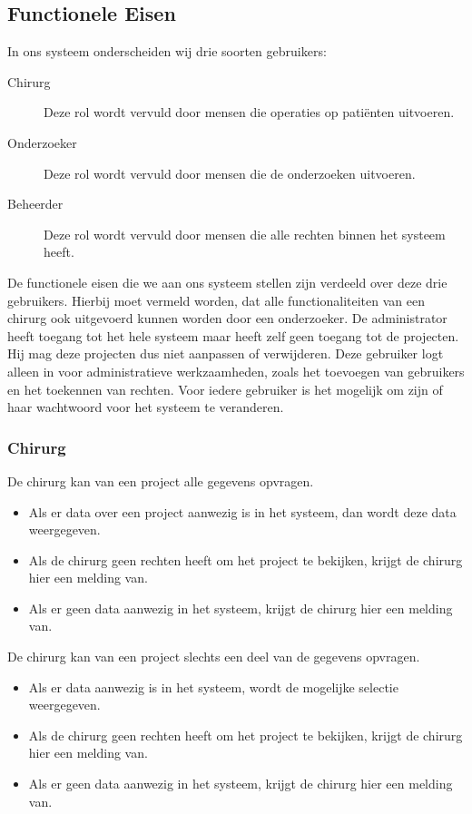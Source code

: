 \subsection{Functionele Eisen}
\label{functionele_eisen}
In ons systeem onderscheiden wij drie soorten gebruikers:
\begin{description}
	\item[Chirurg] Deze rol wordt vervuld door mensen die operaties op pati\"enten uitvoeren.
	\item[Onderzoeker] Deze rol wordt vervuld door mensen die de onderzoeken uitvoeren. 
	\item[Beheerder] Deze rol wordt vervuld door mensen die alle rechten binnen het systeem heeft.
\end{description}
De functionele eisen die we aan ons systeem stellen zijn verdeeld over deze drie gebruikers. Hierbij moet vermeld worden, dat alle functionaliteiten van een chirurg ook uitgevoerd kunnen worden door een onderzoeker.
De administrator heeft toegang tot het hele systeem maar heeft zelf geen toegang tot de projecten. Hij mag deze projecten dus niet aanpassen of verwijderen. Deze gebruiker logt alleen in voor administratieve werkzaamheden, zoals het toevoegen van gebruikers en het toekennen van rechten.
Voor iedere gebruiker is het mogelijk om zijn of haar wachtwoord voor het systeem te veranderen.

\subsubsection{Chirurg}

De chirurg kan van een project alle gegevens opvragen.
\begin{itemize}
	\item Als er data over een project aanwezig is in het systeem, dan wordt deze data weergegeven.
	\item Als de chirurg geen rechten heeft om het project te bekijken, krijgt de chirurg hier een melding van.
	\item Als er geen data aanwezig in het systeem, krijgt de chirurg hier een melding van. 
\end{itemize}

De chirurg kan van een project slechts een deel van de gegevens opvragen.
\begin{itemize}
	\item Als er data aanwezig is in het systeem, wordt de mogelijke selectie weergegeven.
	\item Als de chirurg geen rechten heeft om het project te bekijken, krijgt de chirurg hier een melding van.
	\item Als er geen data aanwezig in het systeem, krijgt de chirurg hier een melding van.
\end{itemize}

